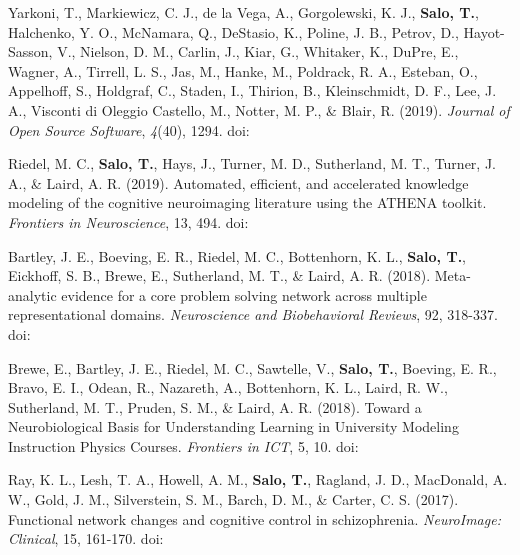 \documentclass[10pt]{article}
\newcommand{\textlink}[3][blue]{\href{#2}{\color{#1}{#3}}}
\begin{document}
\begin{hangparas}{.25in}{1}

	 Yarkoni, T., Markiewicz, C. J., de la Vega, A., Gorgolewski, K. J.,
	 \textbf{Salo, T.}, Halchenko, Y. O., McNamara, Q., DeStasio, K.,
	 Poline, J. B., Petrov, D., Hayot-Sasson, V., Nielson, D. M., Carlin, J.,
	 Kiar, G., Whitaker, K., DuPre, E., Wagner, A., Tirrell, L. S., Jas, M.,
	 Hanke, M., Poldrack, R. A., Esteban, O., Appelhoff, S., Holdgraf, C.,
	 Staden, I., Thirion, B., Kleinschmidt, D. F., Lee, J. A.,
	 Visconti di Oleggio Castello, M., Notter, M. P., \& Blair, R. (2019).
	 \emph{Journal of Open Source Software}, \emph{4}(40), 1294.
	 doi:\textlink{https://doi.org/10.21105/joss.01294}{10.21105/joss.01294}

	\bigskip

	Riedel, M. C., \textbf{Salo, T.}, Hays, J., Turner, M. D., Sutherland, M. T.,
	Turner, J. A., \& Laird, A. R. (2019).
	Automated, efficient, and accelerated knowledge modeling of the cognitive
	neuroimaging literature using the ATHENA toolkit.
	\emph{Frontiers in Neuroscience}, 13, 494.
	doi:\textlink{https://www.frontiersin.org/articles/10.3389/fnins.2019.00494/}{10.3389/fnins.2019.00494}

	\bigskip

	Bartley, J. E., Boeving, E. R., Riedel, M. C., Bottenhorn, K. L.,
	\textbf{Salo, T.}, Eickhoff, S. B., Brewe, E., Sutherland, M. T.,
	\& Laird, A. R. (2018).
	Meta-analytic evidence for a core problem solving network across multiple
	representational domains. \emph{Neuroscience and Biobehavioral Reviews}, 92, 318-337.
	doi:\textlink{https://doi.org/10.1016/j.neubiorev.2018.06.009}{10.1016/j.neubiorev.2018.06.009}

	\bigskip

	Brewe, E., Bartley, J. E., Riedel, M. C., Sawtelle, V., \textbf{Salo, T.},
	Boeving, E. R., Bravo, E. I., Odean, R., Nazareth, A., Bottenhorn, K. L.,
	Laird, R. W., Sutherland, M. T., Pruden, S. M., \& Laird, A. R. (2018).
	Toward a Neurobiological Basis for Understanding Learning in University Modeling
	Instruction Physics Courses. \emph{Frontiers in ICT}, 5, 10.
	doi:\textlink{https://doi.org/10.3389/fict.2018.00010}{10.3389/fict.2018.00010}

	\bigskip

	Ray, K. L., Lesh, T. A., Howell, A. M., \textbf{Salo, T.}, Ragland, J. D.,
	MacDonald, A. W., Gold, J. M., Silverstein, S. M., Barch, D. M., \& Carter,
	C. S. (2017). Functional network changes and cognitive control in schizophrenia.
	\emph{NeuroImage: Clinical}, 15, 161-170.
	doi:\textlink{https://doi.org/10.1016/j.nicl.2017.05.001}{10.1016/j.nicl.2017.05.001}


\end{hangparas}
\end{document}
